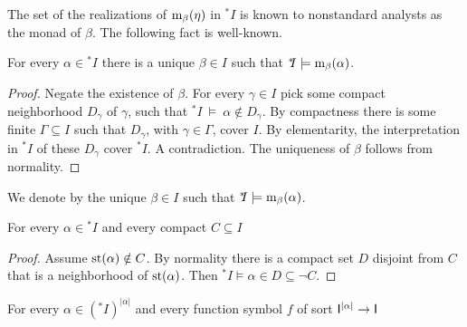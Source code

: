 \documentclass{amsproc}
\renewcommand*{\emph}[1]{%
   \smash{\tikz[baseline]\node[rectangle, fill=teal!25, rounded corners, inner xsep=0.5ex, inner ysep=0.2ex, anchor=base, minimum height = 2.7ex]{\strut #1};}}
\begin{document}
The set of the realizations of ${\rm m}_\beta(\eta)$ in ${}^*\!\!I$ is known to nonstandard analysts as the monad of $\beta$. 
The following fact is well-known.

\begin{fact}\label{fact_uniqueness_st}
  For every $\alpha\in{}^*\!\!I$ there is a unique $\beta\in I$ such that ${}^*\!\!I\models{\rm m}_\beta(\alpha)$.
\end{fact}

\begin{proof}
  Negate the existence of $\beta$.
  For every $\gamma\in I$ pick some compact neighborhood $D_\gamma$ of $\gamma$, such that ${}^*\!\!I\ \models\ \alpha\notin D_\gamma$.
  By compactness there is some finite $\Gamma\subseteq I$ such that $D_\gamma$, with $\gamma\in\Gamma$, cover $I$.
  By elementarity, the interpretation in ${}^*\!\!I$ of these $D_{\gamma}$ cover ${}^*\!\!I$.
  A contradiction.
  The uniqueness of $\beta$ follows from normality.
\end{proof}

We denote by \emph{${\rm st}(\alpha)$\/} the unique $\beta\in I$ such that ${}^*\!\!I\models{\rm m}_\beta(\alpha)$.

\begin{fact}\label{fact_st1}
  For every $\alpha\in{}^*\! I$ and every compact $C\subseteq I$

\end{fact}

\begin{proof}
  Assume ${\rm st}(\alpha)\notin C$.
  By normality there is a compact set $D$ disjoint from $C$ that is a neighborhood of ${\rm st}(\alpha)$.
  Then  ${}^*\!\!I\models\alpha\in D\subseteq\neg C$.
\end{proof}

\begin{fact}\label{fact_terms_st}
  For every $\alpha\in({}^*\!\!I)^{|\alpha|}$ and every function symbol $f$ of sort ${\sf I}^{|\alpha|}\to{\sf I}$

\end{fact}
\end{document}
